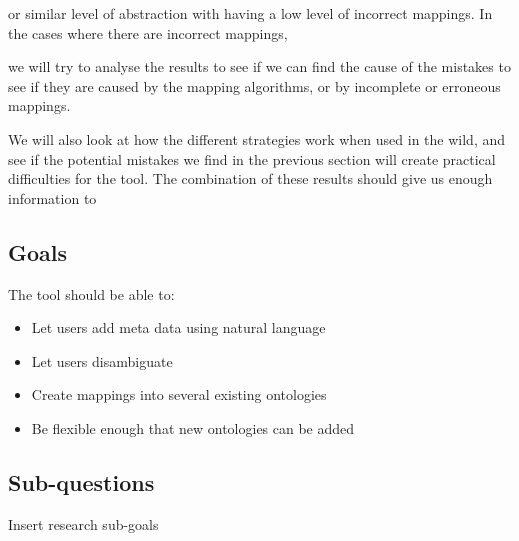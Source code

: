 or similar level of abstraction with having a low level of incorrect mappings.
In the cases where there are incorrect mappings, 

we will try to analyse the results to see if we can find the cause of the mistakes to see if they are caused by the 
mapping algorithms, 
or by incomplete or erroneous mappings.

We will also look at how the different strategies work when used in the wild, 
and see if the potential mistakes we find
in the previous section will create practical difficulties for the tool. 
The combination of these results should give us enough information to 
\subsection{Goals}

The tool should be able to:
\begin{itemize}
	\item Let users add meta data using natural language
	\item Let users disambiguate
	\item Create mappings into several existing ontologies
	\item Be flexible enough that new ontologies can be added
\end{itemize}

\subsection{Sub-questions}
Insert research sub-goals
